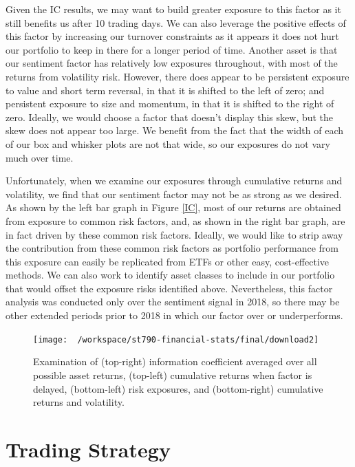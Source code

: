 \documentclass[11,]{article}
\begin{document}
Given the IC results, we may want to build greater exposure to this
factor as it still benefits us after 10 trading days. We can also
leverage the positive effects of this factor by increasing our turnover
constraints as it appears it does not hurt our portfolio to keep in
there for a longer period of time. Another asset is that our sentiment
factor has relatively low exposures throughout, with most of the returns
from volatility risk. However, there does appear to be persistent
exposure to value and short term reversal, in that it is shifted to the
left of zero; and persistent exposure to size and momentum, in that it
is shifted to the right of zero. Ideally, we would choose a factor that
doesn't display this skew, but the skew does not appear too large. We
benefit from the fact that the width of each of our box and whisker
plots are not that wide, so our exposures do not vary much over time.

Unfortunately, when we examine our exposures through cumulative returns
and volatility, we find that our sentiment factor may not be as strong
as we desired. As shown by the left bar graph in Figure \ref{IC}, most
of our returns are obtained from exposure to common risk factors, and,
as shown in the right bar graph, are in fact driven by these common risk
factors. Ideally, we would like to strip away the contribution from
these common risk factors as portfolio performance from this exposure
can easily be replicated from ETFs or other easy, cost-effective
methods. We can also work to identify asset classes to include in our
portfolio that would offset the exposure risks identified above.
Nevertheless, this factor analysis was conducted only over the sentiment
signal in 2018, so there may be other extended periods prior to 2018 in
which our factor over or underperforms.

\begin{figure}

{\centering \texttt{[image: ~/workspace/st790-financial-stats/final/download2]} 

}

\caption{\label{IC}Examination of (top-right) information coefficient averaged over all possible asset returns, (top-left) cumulative returns when factor is delayed, (bottom-left) risk exposures, and (bottom-right) cumulative returns and volatility.}\label{fig:unnamed-chunk-3}
\end{figure}

\hypertarget{trading-strategy}{%
\section{Trading Strategy}\label{trading-strategy}}
\end{document}

